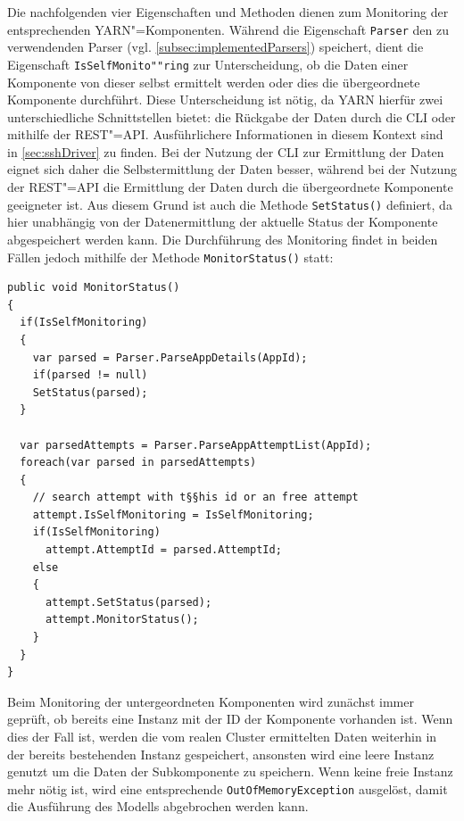 Die nachfolgenden vier Eigenschaften und Methoden dienen zum Monitoring der entsprechenden \gls{YARN}"=Komponenten.
Während die Eigenschaft \texttt{Parser} den zu verwendenden Parser (vgl. \cref{subsec:implementedParsers}) speichert, dient die Eigenschaft \texttt{IsSelfMonito""ring} zur Unterscheidung, ob die Daten einer Komponente von dieser selbst ermittelt werden oder dies die übergeordnete Komponente durchführt.
Diese Unterscheidung ist nötig, da \gls{YARN} hierfür zwei unterschiedliche Schnittstellen bietet: die Rückgabe der Daten durch die \gls{CLI} oder mithilfe der \gls{REST}"=API.
Ausführlichere Informationen in diesem Kontext sind in \cref{sec:sshDriver} zu finden.
Bei der Nutzung der \gls{CLI} zur Ermittlung der Daten eignet sich daher die Selbstermittlung der Daten besser, während bei der Nutzung der REST"=API die Ermittlung der Daten durch die übergeordnete Komponente geeigneter ist.
Aus diesem Grund ist auch die Methode \texttt{SetStatus()} definiert, da hier unabhängig von der Datenermittlung der aktuelle Status der Komponente abgespeichert werden kann.
Die Durchführung des Monitoring findet in beiden Fällen jedoch mithilfe der Methode \texttt{MonitorStatus()} statt:

\begin{lstlisting}[label=lst:monitorAppStatus,style=cs,
caption={[Implementierung der Methode MonitorStatus() in der Klasse YarnApp]
    Implementierung der Methode \texttt{MonitorStatus()} in der Klasse \texttt{YarnApp} (gekürzt).
    Das Monitoring der anderen Komponenten erfolgt analog hierzu.}]
public void MonitorStatus()
{
  if(IsSelfMonitoring)
  {
    var parsed = Parser.ParseAppDetails(AppId);
    if(parsed != null)
    SetStatus(parsed);
  }
  
  var parsedAttempts = Parser.ParseAppAttemptList(AppId);
  foreach(var parsed in parsedAttempts)
  {
    // search attempt with t§§his id or an free attempt
    attempt.IsSelfMonitoring = IsSelfMonitoring;
    if(IsSelfMonitoring)
      attempt.AttemptId = parsed.AttemptId;
    else
    {
      attempt.SetStatus(parsed);
      attempt.MonitorStatus();
    }
  }
}
\end{lstlisting}

Beim Monitoring der untergeordneten Komponenten wird zunächst immer geprüft, ob bereits eine Instanz mit der ID der Komponente vorhanden ist.
Wenn dies der Fall ist, werden die vom realen Cluster ermittelten Daten weiterhin in der bereits bestehenden Instanz gespeichert, ansonsten wird eine leere Instanz genutzt um die Daten der Subkomponente zu speichern.
Wenn keine freie Instanz mehr nötig ist, wird eine entsprechende \texttt{OutOfMemoryException} ausgelöst, damit die Ausführung des Modells abgebrochen werden kann.

